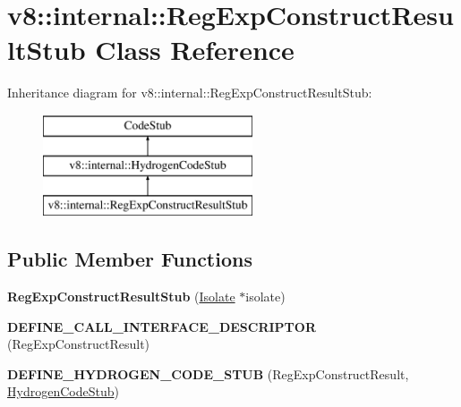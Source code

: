 \hypertarget{classv8_1_1internal_1_1_reg_exp_construct_result_stub}{}\section{v8\+:\+:internal\+:\+:Reg\+Exp\+Construct\+Result\+Stub Class Reference}
\label{classv8_1_1internal_1_1_reg_exp_construct_result_stub}
Inheritance diagram for v8\+:\+:internal\+:\+:Reg\+Exp\+Construct\+Result\+Stub\+:\begin{figure}[H]
\begin{center}
\leavevmode
\includegraphics[height=3.000000cm]{classv8_1_1internal_1_1_reg_exp_construct_result_stub}
\end{center}
\end{figure}
\subsection*{Public Member Functions}
\begin{DoxyCompactItemize}
\item 
{\bfseries Reg\+Exp\+Construct\+Result\+Stub} (\hyperlink{classv8_1_1internal_1_1_isolate}{Isolate} $\ast$isolate)\hypertarget{classv8_1_1internal_1_1_reg_exp_construct_result_stub_a8a0b95eaec3d4f4ee349f5b6c4c86269}{}\label{classv8_1_1internal_1_1_reg_exp_construct_result_stub_a8a0b95eaec3d4f4ee349f5b6c4c86269}

\item 
{\bfseries D\+E\+F\+I\+N\+E\+\_\+\+C\+A\+L\+L\+\_\+\+I\+N\+T\+E\+R\+F\+A\+C\+E\+\_\+\+D\+E\+S\+C\+R\+I\+P\+T\+OR} (Reg\+Exp\+Construct\+Result)\hypertarget{classv8_1_1internal_1_1_reg_exp_construct_result_stub_aa8954a1c614b1632dc6f2ce05fc07221}{}\label{classv8_1_1internal_1_1_reg_exp_construct_result_stub_aa8954a1c614b1632dc6f2ce05fc07221}

\item 
{\bfseries D\+E\+F\+I\+N\+E\+\_\+\+H\+Y\+D\+R\+O\+G\+E\+N\+\_\+\+C\+O\+D\+E\+\_\+\+S\+T\+UB} (Reg\+Exp\+Construct\+Result, \hyperlink{classv8_1_1internal_1_1_hydrogen_code_stub}{Hydrogen\+Code\+Stub})\hypertarget{classv8_1_1internal_1_1_reg_exp_construct_result_stub_ae2a2b8c9dc89702e70454b52ef2800b5}{}\label{classv8_1_1internal_1_1_reg_exp_construct_result_stub_ae2a2b8c9dc89702e70454b52ef2800b5}

\end{DoxyCompactItemize}
